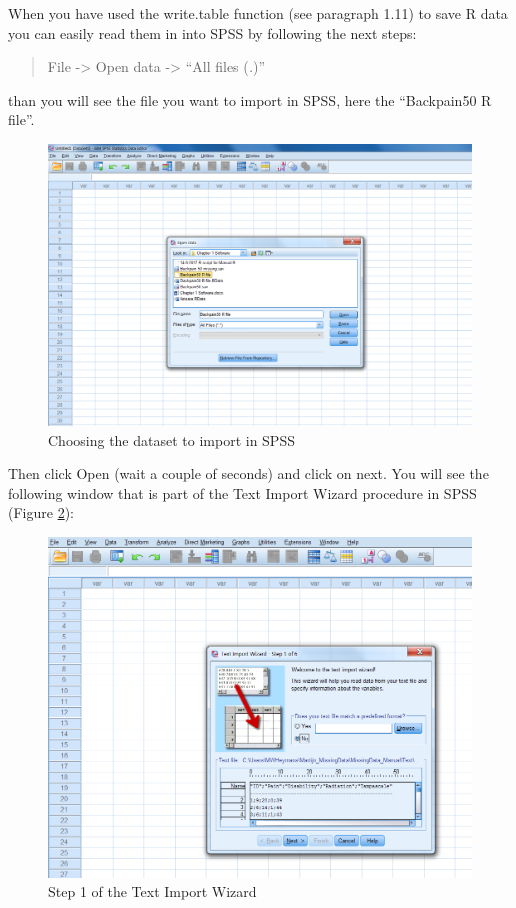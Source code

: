 \documentclass[
]{book}
\begin{document}
When you have used the write.table function (see paragraph 1.11) to save R data you can easily read them in into SPSS by following the next steps:

\begin{quote}
File -\textgreater{} Open data -\textgreater{} ``All files (\emph{.})''
\end{quote}

than you will see the file you want to import in SPSS, here the ``Backpain50 R file''.

\begin{figure}

{\centering \includegraphics[width=0.95\linewidth]{images/fig1.18} 

}

\caption{Choosing the dataset to import in SPSS}\label{fig:fig18}
\end{figure}

Then click Open (wait a couple of seconds) and click on next. You will see the following window that is part of the Text Import Wizard procedure in SPSS (Figure \ref{fig:fig19}):

\begin{figure}

{\centering \includegraphics[width=0.95\linewidth]{images/fig1.19} 

}

\caption{Step 1 of the Text Import Wizard}\label{fig:fig19}
\end{figure}
\end{document}
